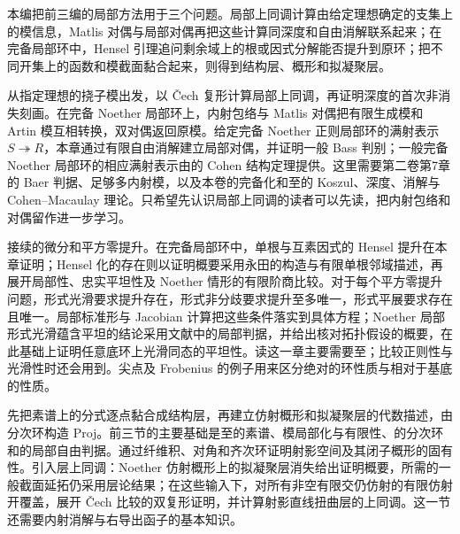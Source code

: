 
\BookPartGuide
本编把前三编的局部方法用于三个问题。局部上同调计算由给定理想确定的支集上的模信息，Matlis 对偶与局部对偶再把这些计算同深度和自由消解联系起来；在完备局部环中，Hensel 引理追问剩余域上的根或因式分解能否提升到原环；把不同开集上的函数和模截面黏合起来，则得到结构层、概形和拟凝聚层。

\ProseParagraphBreak
{}从指定理想的挠子模出发，以 Čech 复形计算局部上同调，再证明深度的首次非消失刻画。在完备 Noether 局部环上，内射包络与 Matlis 对偶把有限生成模和 Artin 模互相转换，双对偶返回原模。给定完备 Noether 正则局部环的满射表示 \(S\twoheadrightarrow R\)，本章通过有限自由消解建立局部对偶，并证明一般 Bass 判别；一般完备 Noether 局部环的相应满射表示由的 Cohen 结构定理提供。这里需要第二卷第7章的 Baer 判据、足够多内射模，以及本卷的完备化和至的 Koszul、深度、消解与 Cohen–Macaulay 理论。只希望先认识局部上同调的读者可以先读，把内射包络和对偶留作进一步学习。

\ProseParagraphBreak
{}接续的微分和平方零提升。在完备局部环中，单根与互素因式的 Hensel 提升在本章证明；Hensel 化的存在则以证明概要采用永田的构造与有限单根邻域描述，再展开局部性、忠实平坦性及 Noether 情形的有限阶商比较。对于每个平方零提升问题，形式光滑要求提升存在，形式非分歧要求提升至多唯一，形式平展要求存在且唯一。局部标准形与 Jacobian 计算把这些条件落实到具体方程；Noether 局部形式光滑蕴含平坦的结论采用文献中的局部判据，并给出核对拓扑假设的概要，在此基础上证明任意底环上光滑同态的平坦性。读这一章主要需要至；比较正则性与光滑性时还会用到。尖点及 Frobenius 的例子用来区分绝对的环性质与相对于基底的性质。

\ProseParagraphBreak
{}先把素谱上的分式逐点黏合成结构层，再建立仿射概形和拟凝聚层的代数描述，由分次环构造 Proj。前三节的主要基础是至的素谱、模局部化与有限性、的分次环和的局部自由判据。通过纤维积、对角和齐次环证明射影空间及其闭子概形的固有性。引入层上同调：Noether 仿射概形上的拟凝聚层消失给出证明概要，所需的一般截面延拓仍采用层论结果；在这些输入下，对所有非空有限交仍仿射的有限仿射开覆盖，展开 Čech 比较的双复形证明，并计算射影直线扭曲层的上同调。这一节还需要内射消解与右导出函子的基本知识。

